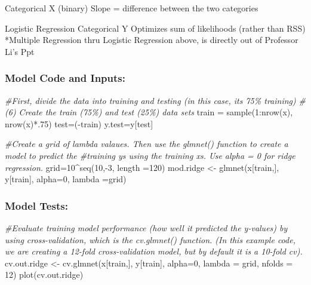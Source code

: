 \documentclass[
]{article}
\newenvironment{Shaded}{\begin{snugshade}}{\end{snugshade}}
\newcommand{\AttributeTok}[1]{\textcolor[rgb]{0.77,0.63,0.00}{#1}}
\newcommand{\CommentTok}[1]{\textcolor[rgb]{0.56,0.35,0.01}{\textit{#1}}}
\newcommand{\DecValTok}[1]{\textcolor[rgb]{0.00,0.00,0.81}{#1}}
\newcommand{\FunctionTok}[1]{\textcolor[rgb]{0.00,0.00,0.00}{#1}}
\newcommand{\NormalTok}[1]{#1}
\newcommand{\OtherTok}[1]{\textcolor[rgb]{0.56,0.35,0.01}{#1}}
\newcommand{\SpecialCharTok}[1]{\textcolor[rgb]{0.00,0.00,0.00}{#1}}
\begin{document}
Categorical X (binary) Slope = difference between the two categories

Logistic Regression Categorical Y Optimizes sum of likelihoods (rather
than RSS) *Multiple Regression thru Logistic Regression above, is
directly out of Professor Li's Ppt

\hypertarget{model-code-and-inputs-1}{%
\subsubsection{Model Code and Inputs:}\label{model-code-and-inputs-1}}

\begin{Shaded}
\begin{Highlighting}[]
\CommentTok{\#First, divide the data into training and testing (in this case, its 75\% training)}
\CommentTok{\# (6) Create the train (75\%) and test (25\%) data sets }
\NormalTok{train }\OtherTok{=} \FunctionTok{sample}\NormalTok{(}\DecValTok{1}\SpecialCharTok{:}\FunctionTok{nrow}\NormalTok{(x), }\FunctionTok{nrow}\NormalTok{(x)}\SpecialCharTok{*}\NormalTok{.}\DecValTok{75}\NormalTok{)}
\NormalTok{test}\OtherTok{=}\NormalTok{(}\SpecialCharTok{{-}}\NormalTok{train)}
\NormalTok{y.test}\OtherTok{=}\NormalTok{y[test]}

\CommentTok{\#Create a grid of lambda valaues. Then use the glmnet() function to create a model to predict the \#training y\textquotesingle{}s using the training x\textquotesingle{}s. Use alpha = 0 for ridge regression.}
\NormalTok{grid}\OtherTok{=}\DecValTok{10}\SpecialCharTok{\^{}}\FunctionTok{seq}\NormalTok{(}\DecValTok{10}\NormalTok{,}\SpecialCharTok{{-}}\DecValTok{3}\NormalTok{, }\AttributeTok{length =}\DecValTok{120}\NormalTok{)}
\NormalTok{mod.ridge }\OtherTok{\textless{}{-}} \FunctionTok{glmnet}\NormalTok{(x[train,], y[train], }\AttributeTok{alpha=}\DecValTok{0}\NormalTok{, }\AttributeTok{lambda =}\NormalTok{grid)}
\end{Highlighting}
\end{Shaded}

\hypertarget{model-tests-1}{%
\subsubsection{Model Tests:}\label{model-tests-1}}

\begin{Shaded}
\begin{Highlighting}[]
\CommentTok{\#Evaluate training model performance (how well it predicted the y{-}values) by using cross{-}validation, which is the cv.glmnet() function. (In this example code, we are creating a 12{-}fold cross{-}validation model, but by default it is a 10{-}fold cv).}
\NormalTok{cv.out.ridge }\OtherTok{\textless{}{-}} \FunctionTok{cv.glmnet}\NormalTok{(x[train,], y[train], }\AttributeTok{alpha=}\DecValTok{0}\NormalTok{, }\AttributeTok{lambda =}\NormalTok{ grid, }\AttributeTok{nfolds =} \DecValTok{12}\NormalTok{)}
\FunctionTok{plot}\NormalTok{(cv.out.ridge)}
\end{Highlighting}
\end{Shaded}
\end{document}
